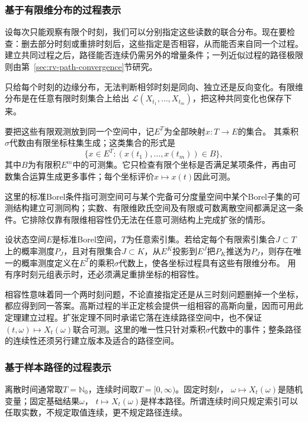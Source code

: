 \subsubsection{基于有限维分布的过程表示}
\label{sec:rv-finite-dimensional-laws}
设每次只能观察有限个时刻，我们可以分别指定这些读数的联合分布。现在要检查：删去部分时刻或重排时刻后，这些指定是否相容，从而能否来自同一个过程。建立共同过程之后，路径能否连续仍需另外的增量条件；一列近似过程的路径极限则由第~\ref{sec:rv-path-convergence}节研究。

只给每个时刻的边缘分布，无法判断相邻时刻是同向、独立还是反向变化。有限维分布是在任意有限时刻集合上给出
\(\mathcal L(X_{t_1},\ldots,X_{t_m})\)，把这种共同变化也保存下来。

要把这些有限观测放到同一个空间中，记\(E^T\)为全部映射\(x:T\to E\)的集合。
其乘积\(\sigma\)代数由有限坐标柱集生成；这类集合的形式是
\[
 \{x\in E^T:(x(t_1),\ldots,x(t_m))\in B\},
\]
其中\(B\)为有限积\(E^m\)中的可测集。它只检查有限个坐标是否满足某项条件，再由可数集合运算生成更多事件；每个坐标评价\(x\mapsto x(t)\)因此可测。

这里的标准Borel条件指可测空间可与某个完备可分度量空间中某个Borel子集的可测结构建立可测同构；实数、有限维欧氏空间及有限或可数离散空间都满足这一条件。它排除仅靠有限维相容性仍无法在任意可测结构上完成扩张的情形。

\begin{theorem}[Kolmogorov扩张的标准Borel版本]
\label{thm:rv-kolmogorov-extension}

设状态空间\(E\)是标准Borel空间，\(T\)为任意索引集。若给定每个有限索引集合\(J\subset T\)上的概率测度\(P_J\)，且对有限集合\(J\subset K\)，从\(E^K\)投影到\(E^J\)把\(P_K\)推送为\(P_J\)，则存在唯一的概率测度定义在\(E^T\)的乘积\(\sigma\)代数上，使各坐标过程具有这些有限维分布。
用有序时刻元组表示时，还必须满足重排坐标的相容性。
\end{theorem}
相容性意味着同一个两时刻问题，不论直接指定还是从三时刻问题删掉一个坐标，都应得到同一答案。高斯过程的半正定核会提供一组相容的高斯向量，因而可用此定理建立过程。扩张定理不同时承诺它落在连续路径空间中，也不保证
\((t,\omega)\mapsto X_t(\omega)\)联合可测。这里的唯一性只针对乘积\(\sigma\)代数中的事件；整条路径的连续性还须另行建立版本及适合的路径空间。

\subsubsection{基于样本路径的过程表示}
离散时间通常取\(T=\mathbb N_0\)，连续时间取\(T=[0,\infty)\)。固定时刻\(t\)，
\(\omega\mapsto X_t(\omega)\)是随机变量；固定基础结果\(\omega\)，
\(t\mapsto X_t(\omega)\)是样本路径。所谓连续时间只规定索引可以任取实数，不规定取值连续，更不规定路径连续。

